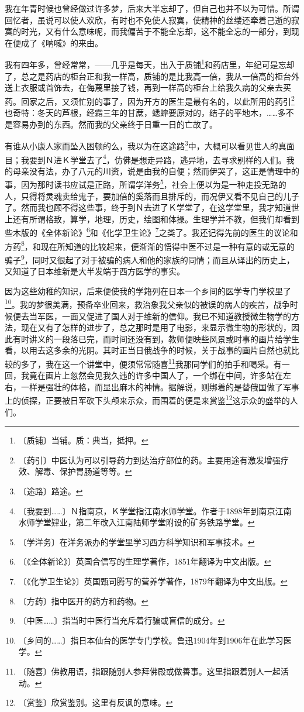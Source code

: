 \documentclass[12pt,UTF-8,openany]{ctexbook}
\begin{document}
\begin{normalsize}
    
    我在年青时候也曾经做过许多梦，后来大半忘却了，但自己也并不以为可惜。所谓回忆者，虽说可以使人欢欣，有时也不免使人寂寞，使精神的丝缕还牵着己逝的寂寞的时光，又有什么意味呢，而我偏苦于不能全忘却，这不能全忘的一部分，到现在便成了《呐喊》的来由。
    
    我有四年多，曾经常常，——几乎是每天，出入于质铺\footnote{〔质铺〕当铺。质：典当，抵押。}和药店里，年纪可是忘却了，总之是药店的柜台正和我一样高，质铺的是比我高一倍，我从一倍高的柜台外送上衣服或首饰去，在侮蔑里接了钱，再到一样高的柜台上给我久病的父亲去买药。回家之后，又须忙别的事了，因为开方的医生是最有名的，以此所用的药引\footnote{〔药引〕中医认为可以引导药力到达治疗部位的药。主要用途有激发增强疗效、解毒、保护胃肠道等等。}也奇特：冬天的芦根，经霜三年的甘蔗，蟋蟀要原对的，结子的平地木，……多不是容易办到的东西。然而我的父亲终于日重一日的亡故了。
    
    有谁从小康人家而坠入困顿的么，我以为在这途路\footnote{〔途路〕路途。}中，大概可以看见世人的真面目；我要到Ｎ进Ｋ学堂去了\footnote{〔我要到……〕Ｎ指南京，Ｋ学堂指江南水师学堂。作者于1898年到南京江南水师学堂肄业，第二年改入江南陆师学堂附设的矿务铁路学堂。}，仿佛是想走异路，逃异地，去寻求别样的人们。我的母亲没有法，办了八元的川资，说是由我的自便；然而伊哭了，这正是情理中的事，因为那时读书应试是正路，所谓学洋务\footnote{〔学洋务〕在洋务派办的学堂里学习西方科学知识和军事技术。}，社会上便以为是一种走投无路的人，只得将灵魂卖给鬼子，要加倍的奚落而且排斥的，而况伊又看不见自己的儿子了。然而我也顾不得这些事，终于到Ｎ去进了Ｋ学堂了，在这学堂里，我才知道世上还有所谓格致，算学，地理，历史，绘图和体操。生理学并不教，但我们却看到些木版的《全体新论》\footnote{〔《全体新论》〕英国合信写的生理学著作，1851年翻译为中文出版。}和《化学卫生论》\footnote{〔《化学卫生论》〕英国甄司腾写的营养学著作，1879年翻译为中文出版。}之类了。我还记得先前的医生的议论和方药\footnote{〔方药〕指中医开的药方和药物。}，和现在所知道的比较起来，便渐渐的悟得中医不过是一种有意的或无意的骗子\footnote{〔中医……〕指当时中医行当充斥着行骗或盲信的成分。}，同时又很起了对于被骗的病人和他的家族的同情；而且从译出的历史上，又知道了日本维新是大半发端于西方医学的事实。
    
    因为这些幼稚的知识，后来便使我的学籍列在日本一个乡间的医学专门学校里了\footnote{〔乡间的……〕指日本仙台的医学专门学校。鲁迅1904年到1906年在此学习医学。}。我的梦很美满，预备卒业回来，救治象我父亲似的被误的病人的疾苦，战争时候便去当军医，一面又促进了国人对于维新的信仰。我已不知道教授微生物学的方法，现在又有了怎样的进步了，总之那时是用了电影，来显示微生物的形状的，因此有时讲义的一段落已完，而时间还没有到，教师便映些风景或时事的画片给学生看，以用去这多余的光阴。其时正当日俄战争的时候，关于战事的画片自然也就比较的多了，我在这一个讲堂中，便须常常随喜\footnote{〔随喜〕佛教用语，指跟随别人参拜佛殿或做善事。这里指跟着别人一起活动。}我那同学们的拍手和喝采。有一回，我竟在画片上忽然会见我久违的许多中国人了，一个绑在中间，许多站在左右，一样是强壮的体格，而显出麻木的神情。据解说，则绑着的是替俄国做了军事上的侦探，正要被日军砍下头颅来示众，而围着的便是来赏鉴\footnote{〔赏鉴〕欣赏鉴别。这里有反讽的意味。}这示众的盛举的人们。
    

\end{normalsize}
\end{document}
